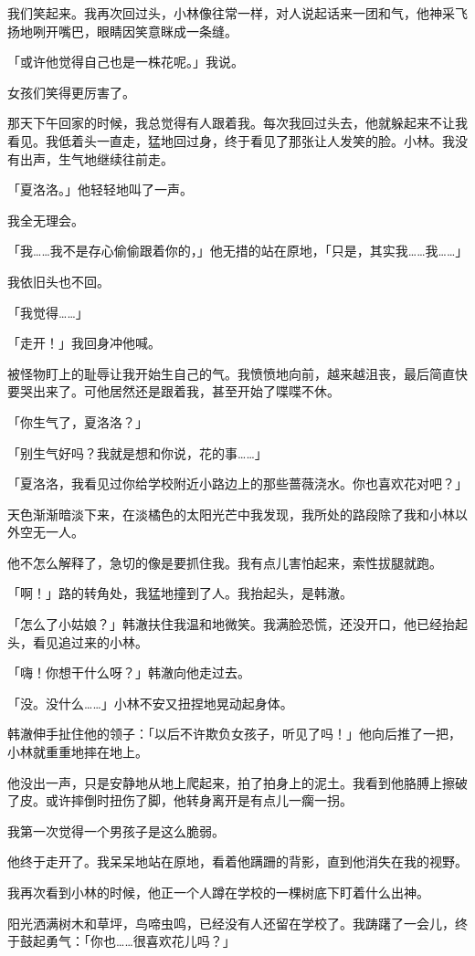 \documentclass[UTF8]{ctexart}
\begin{document}
我们笑起来。我再次回过头，小林像往常一样，对人说起话来一团和气，他神采飞扬地咧开嘴巴，眼睛因笑意眯成一条缝。

「或许他觉得自己也是一株花呢。」我说。

女孩们笑得更厉害了。

那天下午回家的时候，我总觉得有人跟着我。每次我回过头去，他就躲起来不让我看见。我低着头一直走，猛地回过身，终于看见了那张让人发笑的脸。小林。我没有出声，生气地继续往前走。

「夏洛洛。」他轻轻地叫了一声。

我全无理会。

「我……我不是存心偷偷跟着你的，」他无措的站在原地，「只是，其实我……我……」

我依旧头也不回。

「我觉得……」

「走开！」我回身冲他喊。

被怪物盯上的耻辱让我开始生自己的气。我愤愤地向前，越来越沮丧，最后简直快要哭出来了。可他居然还是跟着我，甚至开始了喋喋不休。

「你生气了，夏洛洛？」

「别生气好吗？我就是想和你说，花的事……」

「夏洛洛，我看见过你给学校附近小路边上的那些蔷薇浇水。你也喜欢花对吧？」

天色渐渐暗淡下来，在淡橘色的太阳光芒中我发现，我所处的路段除了我和小林以外空无一人。

他不怎么解释了，急切的像是要抓住我。我有点儿害怕起来，索性拔腿就跑。

「啊！」路的转角处，我猛地撞到了人。我抬起头，是韩澈。

「怎么了小姑娘？」韩澈扶住我温和地微笑。我满脸恐慌，还没开口，他已经抬起头，看见追过来的小林。

「嗨！你想干什么呀？」韩澈向他走过去。

「没。没什么……」小林不安又扭捏地晃动起身体。

韩澈伸手扯住他的领子：「以后不许欺负女孩子，听见了吗！」他向后推了一把，小林就重重地摔在地上。

他没出一声，只是安静地从地上爬起来，拍了拍身上的泥土。我看到他胳膊上擦破了皮。或许摔倒时扭伤了脚，他转身离开是有点儿一瘸一拐。

我第一次觉得一个男孩子是这么脆弱。

他终于走开了。我呆呆地站在原地，看着他蹒跚的背影，直到他消失在我的视野。

我再次看到小林的时候，他正一个人蹲在学校的一棵树底下盯着什么出神。

阳光洒满树木和草坪，鸟啼虫鸣，已经没有人还留在学校了。我踌躇了一会儿，终于鼓起勇气：「你也……很喜欢花儿吗？」
\end{document}

